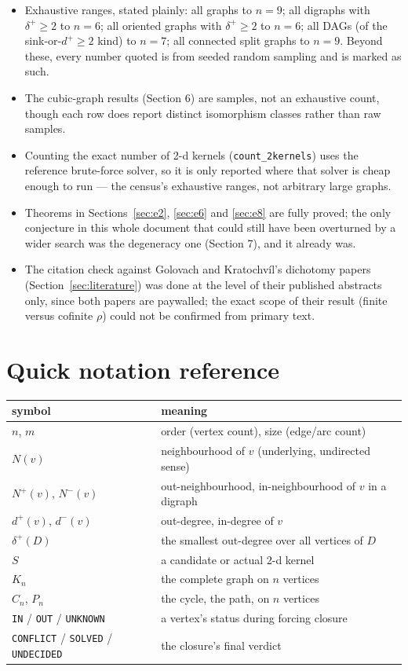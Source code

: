 \documentclass[11pt]{article}
\theoremstyle{plain}
\theoremstyle{definition}
\theoremstyle{remark}
\begin{document}
\begin{itemize}[nosep]
\item Exhaustive ranges, stated plainly: all graphs to $n=9$; all digraphs with
$\delta^+\ge2$ to $n=6$; all oriented graphs with $\delta^+\ge2$ to $n=6$; all DAGs (of
the sink-or-$d^+\ge2$ kind) to $n=7$; all connected split graphs to $n=9$. Beyond
these, every number quoted is from seeded random sampling and is marked as such.
\item The cubic-graph results (Section 6) are samples, not an exhaustive count, though
each row does report distinct isomorphism classes rather than raw samples.
\item Counting the exact number of 2-d kernels (\texttt{count\_2kernels}) uses the
reference brute-force solver, so it is only reported where that solver is cheap
enough to run — the census's exhaustive ranges, not arbitrary large graphs.
\item Theorems in Sections~\ref{sec:e2}, \ref{sec:e6} and \ref{sec:e8} are fully
proved; the only conjecture in this whole document that could still have been
overturned by a wider search was the degeneracy one (Section 7), and it already was.
\item The citation check against Golovach and Kratochv\'il's dichotomy papers
(Section~\ref{sec:literature}) was done at the level of their published abstracts
only, since both papers are paywalled; the exact scope of their result (finite versus
cofinite $\rho$) could not be confirmed from primary text.
\end{itemize}

\section*{Quick notation reference}

\begin{center}
\begin{tabular}{@{}ll@{}}
\toprule
symbol & meaning \\
\midrule
$n$, $m$ & order (vertex count), size (edge/arc count) \\
$N(v)$ & neighbourhood of $v$ (underlying, undirected sense) \\
$N^+(v)$, $N^-(v)$ & out-neighbourhood, in-neighbourhood of $v$ in a digraph \\
$d^+(v)$, $d^-(v)$ & out-degree, in-degree of $v$ \\
$\delta^+(D)$ & the smallest out-degree over all vertices of $D$ \\
$S$ & a candidate or actual 2-d kernel \\
$K_n$ & the complete graph on $n$ vertices \\
$C_n$, $P_n$ & the cycle, the path, on $n$ vertices \\
\texttt{IN} / \texttt{OUT} / \texttt{UNKNOWN} & a vertex's status during forcing closure \\
\texttt{CONFLICT} / \texttt{SOLVED} / \texttt{UNDECIDED} & the closure's final verdict \\
\bottomrule
\end{tabular}
\end{center}
\end{document}
